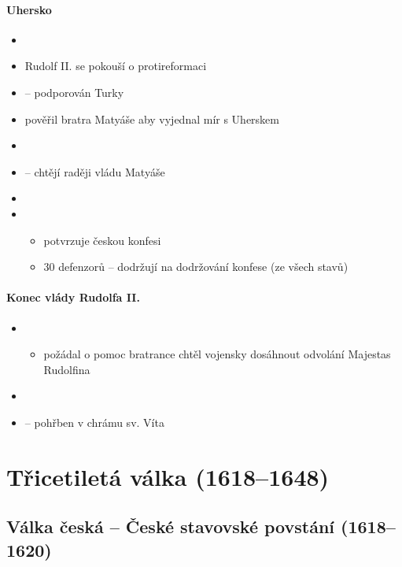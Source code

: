 \paragraph{Uhersko}
\begin{itemize}
\item {}
\item Rudolf II. se pokouší o protireformaci
\item {} -- podporován Turky
\item pověřil bratra Matyáše aby vyjednal mír s Uherskem
\item {}
\item {} -- chtějí raději vládu Matyáše
\item {}
\item {}
	\begin{itemize}
	\item potvrzuje českou konfesi
	\item 30 defenzorů -- dodržují na dodržování konfese (ze všech stavů)
	\end{itemize}
\end{itemize}


\paragraph{Konec vlády Rudolfa II.}
\begin{itemize}
\item {}
	\begin{itemize}
	\item požádal o pomoc bratrance \ra chtěl vojensky dosáhnout odvolání Majestas Rudolfina
	\end{itemize}
\item {}
\item {} -- pohřben v chrámu sv. Víta
\end{itemize}

\section{Třicetiletá válka (1618--1648)}
\subsection{Válka česká -- České stavovské povstání (1618--1620)}
